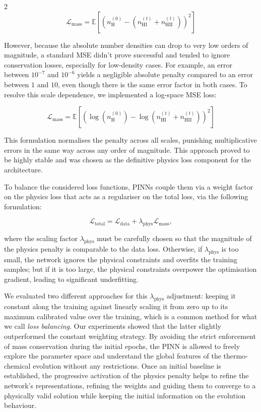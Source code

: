 \documentclass[10pt,a4paper]{article}
\begin{document}
\begin{multicols}{2}
\[
\mathcal{L}_{\text{mass}} = \mathbb{E}\left[\left(n_{\text{H}}^{(0)} - \left(n_{\mathrm{HI}}^{(t)} + n_{\mathrm{HII}}^{(t)}\right)\right)^2\right]
\]

However, because the absolute number densities can drop to very low orders of magnitude, a standard MSE didn't prove successful and tended to ignore conservation losses, especially for low-density cases. For example, an error between $10^{-7}$ and $10^{-6}$ yields a negligible absolute penalty compared to an error between $1$ and $10$, even though there is the same error factor in both cases. To resolve this scale dependence, we implemented a log-space MSE loss:

\[
\mathcal{L}_{\text{mass}} = \mathbb{E}\left[ \left( \log(n_{\text{H}}^{(0)}) - \log(n_{\mathrm{HI}}^{(t)} + n_{\mathrm{HII}}^{(t)}) \right)^2 \right]
\]

This formulation normalises the penalty across all scales, punishing multiplicative errors in the same way across any order of magnitude. This approach proved to be highly stable and was chosen as the definitive physics loss component for the architecture.

To balance the considered loss functions, PINNs couple them via a weight factor on the physics loss that acts as a regulariser on the total loss, via the following formulation:

\[
\mathcal{L}_{\text{total}} = \mathcal{L}_{\text{data}} + \lambda_{\text{phys}}\mathcal{L}_{\text{mass}},
\]

where the scaling factor $\lambda_{\text{phys}}$ must be carefully chosen so that the magnitude of the physics penalty is comparable to the data loss. Otherwise, if $\lambda_{\text{phys}}$ is too small, the network ignores the physical constraints and overfits the training samples; but if it is too large, the physical constraints overpower the optimisation gradient, leading to significant underfitting.

We evaluated two different approaches for this $\lambda_{\text{phys}}$ adjustment: keeping it constant along the training against linearly scaling it from zero up to its maximum calibrated value over the training, which is a common method for what we call \textit{loss balancing}. Our experiments showed that the latter slightly outperformed the constant weighting strategy. By avoiding the strict enforcement of mass conservation during the initial epochs, the PINN is allowed to freely explore the parameter space and understand the global features of the thermo-chemical evolution without any restrictions. Once an initial baseline is established, the progressive activation of the physics penalty helps to refine the network's representations, refining the weights and guiding them to converge to a physically valid solution while keeping the initial information on the evolution behaviour.


\end{multicols}
\end{document}
